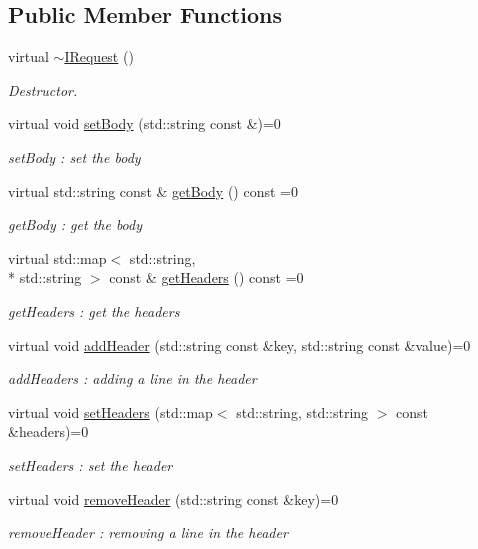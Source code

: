 \subsection*{Public Member Functions}
\begin{DoxyCompactItemize}
\item 
\hypertarget{classapimeal_1_1IRequest_a200a902019f7ef0272866d29a00feed6}{virtual \hyperlink{classapimeal_1_1IRequest_a200a902019f7ef0272866d29a00feed6}{$\sim$\-I\-Request} ()}\label{classapimeal_1_1IRequest_a200a902019f7ef0272866d29a00feed6}

\begin{DoxyCompactList}\small\item\em Destructor. \end{DoxyCompactList}\item 
virtual void \hyperlink{classapimeal_1_1IRequest_a91098a447ab3b6cc035dd4fd789e5ae6}{set\-Body} (std\-::string const \&)=0
\begin{DoxyCompactList}\small\item\em set\-Body \-: set the body \end{DoxyCompactList}\item 
virtual std\-::string const \& \hyperlink{classapimeal_1_1IRequest_ae960126642019a346b99b25401d8227a}{get\-Body} () const =0
\begin{DoxyCompactList}\small\item\em get\-Body \-: get the body \end{DoxyCompactList}\item 
virtual std\-::map$<$ std\-::string, \\*
std\-::string $>$ const \& \hyperlink{classapimeal_1_1IRequest_ae1570e7bce31e01b19a44d2b1552ee1a}{get\-Headers} () const =0
\begin{DoxyCompactList}\small\item\em get\-Headers \-: get the headers \end{DoxyCompactList}\item 
virtual void \hyperlink{classapimeal_1_1IRequest_a6561e8a6ec011ac8e23ec2e9a2007ee5}{add\-Header} (std\-::string const \&key, std\-::string const \&value)=0
\begin{DoxyCompactList}\small\item\em add\-Headers \-: adding a line in the header \end{DoxyCompactList}\item 
virtual void \hyperlink{classapimeal_1_1IRequest_a6721f40bf978b65fe16c391be6de5ee6}{set\-Headers} (std\-::map$<$ std\-::string, std\-::string $>$ const \&headers)=0
\begin{DoxyCompactList}\small\item\em set\-Headers \-: set the header \end{DoxyCompactList}\item 
virtual void \hyperlink{classapimeal_1_1IRequest_aa2e8c5d8e3ea03dfd9d4a85fa36ad25b}{remove\-Header} (std\-::string const \&key)=0
\begin{DoxyCompactList}\small\item\em remove\-Header \-: removing a line in the header \end{DoxyCompactList}\end{DoxyCompactItemize}


